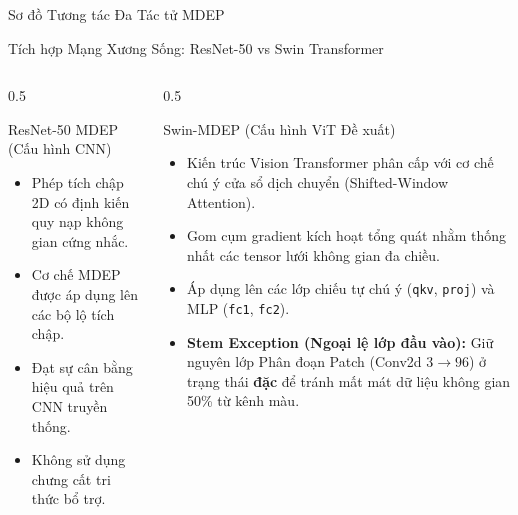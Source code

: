 \documentclass[aspectratio=169, 10pt]{beamer}
\begin{document}
\begin{frame}{Sơ đồ Tương tác Đa Tác tử MDEP}
\end{frame}

\begin{frame}{Tích hợp Mạng Xương Sống: ResNet-50 vs Swin Transformer}
  \begin{columns}
    \begin{column}{0.5\textwidth}
      \begin{block}{ResNet-50 MDEP (Cấu hình CNN)}
        \begin{itemize}
          \item Phép tích chập 2D có định kiến quy nạp không gian cứng nhắc.
          \item Cơ chế MDEP được áp dụng lên các bộ lộ tích chập.
          \item Đạt sự cân bằng hiệu quả trên CNN truyền thống.
          \item Không sử dụng chưng cất tri thức bổ trợ.
        \end{itemize}
      \end{block}
    \end{column}
    \begin{column}{0.5\textwidth}
      \begin{block}{Swin-MDEP (Cấu hình ViT Đề xuất)}
        \begin{itemize}
          \item Kiến trúc Vision Transformer phân cấp với cơ chế chú ý cửa sổ dịch chuyển (Shifted-Window Attention).
          \item Gom cụm gradient kích hoạt tổng quát nhằm thống nhất các tensor lưới không gian đa chiều.
          \item Áp dụng lên các lớp chiếu tự chú ý (\texttt{qkv}, \texttt{proj}) và MLP (\texttt{fc1}, \texttt{fc2}).
          \item \textbf{Stem Exception (Ngoại lệ lớp đầu vào):} Giữ nguyên lớp Phân đoạn Patch (Conv2d $3 \to 96$) ở trạng thái \textbf{đặc} để tránh mất mát dữ liệu không gian 50\% từ kênh màu.
        \end{itemize}
      \end{block}
    \end{column}
  \end{columns}
\end{frame}
\end{document}
